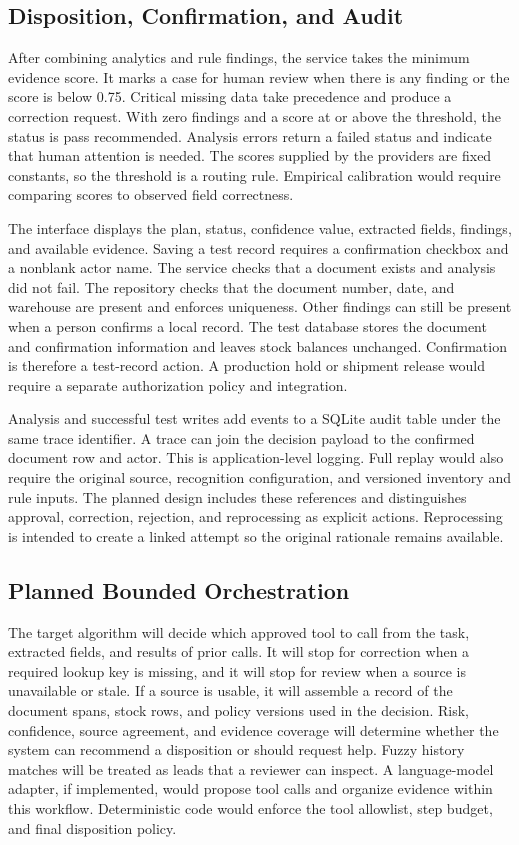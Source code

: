 \documentclass[conference]{IEEEtran}
\begin{document}
\subsection{Disposition, Confirmation, and Audit}
After combining analytics and rule findings, the service takes the minimum evidence score. It marks a case for human review when there is any finding or the score is below 0.75. Critical missing data take precedence and produce a correction request. With zero findings and a score at or above the threshold, the status is pass recommended. Analysis errors return a failed status and indicate that human attention is needed. The scores supplied by the providers are fixed constants, so the threshold is a routing rule. Empirical calibration would require comparing scores to observed field correctness.

The interface displays the plan, status, confidence value, extracted fields, findings, and available evidence. Saving a test record requires a confirmation checkbox and a nonblank actor name. The service checks that a document exists and analysis did not fail. The repository checks that the document number, date, and warehouse are present and enforces uniqueness. Other findings can still be present when a person confirms a local record. The test database stores the document and confirmation information and leaves stock balances unchanged. Confirmation is therefore a test-record action. A production hold or shipment release would require a separate authorization policy and integration.

Analysis and successful test writes add events to a SQLite audit table under the same trace identifier. A trace can join the decision payload to the confirmed document row and actor. This is application-level logging. Full replay would also require the original source, recognition configuration, and versioned inventory and rule inputs. The planned design includes these references and distinguishes approval, correction, rejection, and reprocessing as explicit actions. Reprocessing is intended to create a linked attempt so the original rationale remains available.

\subsection{Planned Bounded Orchestration}
The target algorithm will decide which approved tool to call from the task, extracted fields, and results of prior calls. It will stop for correction when a required lookup key is missing, and it will stop for review when a source is unavailable or stale. If a source is usable, it will assemble a record of the document spans, stock rows, and policy versions used in the decision. Risk, confidence, source agreement, and evidence coverage will determine whether the system can recommend a disposition or should request help. Fuzzy history matches will be treated as leads that a reviewer can inspect. A language-model adapter, if implemented, would propose tool calls and organize evidence within this workflow. Deterministic code would enforce the tool allowlist, step budget, and final disposition policy.
\end{document}
